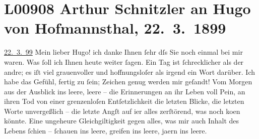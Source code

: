 

\section[Arthur Schnitzler an Hugo von Hofmannsthal, 22. 3. 1899]{L00908 Arthur Schnitzler an Hugo von Hofmannsthal, 22. 3. 1899}
\nopagebreak{}
\rehead{ }\normalsize\beginnumbering{}
\toendnotes[C]{\smallbreak\pagebreak[2]}
\toendnotes[C]{\smallbreak}
\toendnotes[C]{\smallbreak}
\pstart
           \raggedleft{}{\pb}\uline{22. 3. 99}\pend
           \vspace{0.5em}
\pstart
           Mein lieber Hugo! ich danke Ihnen{ }ſehr dſs Sie noch einmal bei mir
               waren. Was{ }ſoll ich Ihnen heute weiter{ }ſagen. Ein Tag ist{ }ſchrecklicher als der
               andre; es iſt viel grauenvoller und hoffnungsloſer als irgend ein Wort darüber. Ich
               habe das Gefühl, fertig zu{ }ſein; Zeichen genug werden mir geſandt! Vom Morgen aus der
               Ausblick ins leere, {\pb}leere – die Erinnerungen an ihr Leben voll Pein, an ihren
               Tod von einer grenzenloſen Entſetzlichkeit{\dotstwo} die letzten
               Blicke, die letzten Worte unvergeßlich – die letzte Angſt auf i{\geminationm}er alles zerſtörend, was noch ko{\geminationm}en könnte. Eine ungeheure Gleichgiltigkeit gegen alles,
               was mir auch Inhalt des Lebens{ }ſchien –{ }ſchauen ins leere, {\pb}greifen ins leere, ja{\geminationm}ern ins leere.\pend
           
